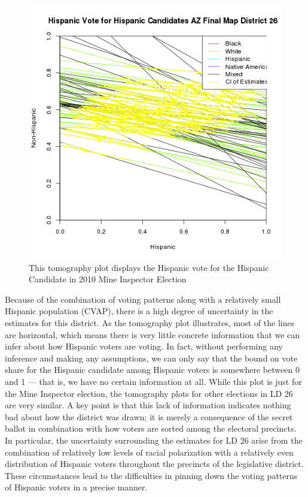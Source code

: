 \documentclass[12pt]{article}
\begin{document}
\begin{figure}[htb]
\begin{center}
\includegraphics[scale=.75]{figs/pl_hispvote_h_26_smine.png}
\caption{\label{tomog_26}This tomography plot displays the Hispanic vote for the Hispanic Candidate in 2010 Mine Inspector Election}
\end{center}
\end{figure}

Because of the combination of voting patterns along with a relatively
small Hispanic population (CVAP), there is a high degree of
uncertainty in the estimates for this district. As the tomography plot
illustrates, most of the lines are horizontal, which means there is
very little concrete information that we can infer about how Hispanic
voters are voting. In fact, without performing any inference and
making any assumptions, we can only say that the bound on vote share
for the Hispanic candidate among Hispanic voters is somewhere between
0 and 1 --- that is, we have no certain information at all. While this
plot is just for the Mine Inspector election, the tomography plots for
other elections in LD 26 are very similar.  A key point is that this
lack of information indicates nothing bad about how the district was
drawn; it is merely a consequence of the secret ballot in combination
with how voters are sorted among the electoral precincts.  In
particular, the uncertainty surrounding the estimates for LD 26 arise
from the combination of relatively low levels of racial polarization
with a relatively even distribution of Hispanic voters throughout the
precincts of the legislative district. These circumstances lead to the
difficulties in pinning down the voting patterns of Hispanic voters in
a precise manner.  
\end{document}
